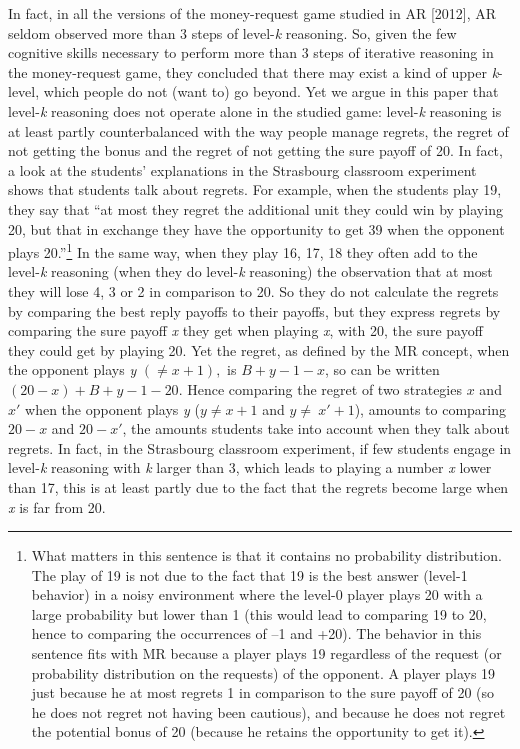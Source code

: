 \begin{Article}
\begin{refsection}[Umbhauer]
In fact, in all the versions of the money-request game studied in AR
{[}2012{]}, AR seldom observed more than 3 steps of level-\emph{k}
reasoning. So, given the few cognitive skills necessary to perform more
than 3 steps of iterative reasoning in the money-request game, they
concluded that there may exist a kind of upper \emph{k}-level, which
people do not (want to) go beyond. Yet we argue in this paper that
level-\emph{k} reasoning does not operate alone in the studied game:
level-\emph{k} reasoning is at least partly counterbalanced with the way
people manage regrets, the regret of not getting the bonus and the
regret of not getting the sure payoff of 20. In fact, a look at the
students' explanations in the Strasbourg classroom experiment shows that
students talk about regrets. For example, when the students play 19,
they say that ``at most they regret the additional unit they could win
by playing 20, but that in exchange they have the opportunity to get 39
when the opponent plays 20.''\footnote{What matters in this sentence is
  that it contains no probability distribution. The play of 19 is not
  due to the fact that 19 is the best answer (level-1 behavior) in a
  noisy environment where the level-0 player plays 20 with a large
  probability but lower than 1 (this would lead to comparing 19 to 20,
  hence to comparing the occurrences of --1 and +20). The behavior in
  this sentence fits with MR because a player plays 19 regardless of the
  request (or probability distribution on the requests) of the opponent.
  A player plays 19 just because he at most regrets 1 in comparison to
  the sure payoff of 20 (so he does not regret not having been
  cautious), and because he does not regret the potential bonus of 20
  (because he retains the opportunity to get it).} In the same way, when
they play 16, 17, 18 they often add to the level-\emph{k} reasoning
(when they do level-\emph{k} reasoning) the observation that at most
they will lose 4, 3 or 2 in comparison to 20. So they do not calculate
the regrets by comparing the best reply payoffs to their payoffs, but
they express regrets by comparing the sure payoff \emph{x} they get when
playing \emph{x}, with 20, the sure payoff they could get by playing 20.
Yet the regret, as defined by the MR concept, when the opponent plays
\emph{y} \(( \neq x + 1),\) is \(B + y - 1 - x\), so can be written
\((20 - x) + B + y - 1 - 20\). Hence comparing the regret of two
strategies $x$ and $x′$ when the opponent plays \emph{y}
(\(y \neq x + 1\) and \(y \neq \ x' + 1\)), amounts to comparing
\(20 - x\) and \(20 - x'\), the amounts students take into
account when they talk about regrets. In fact, in the Strasbourg
classroom experiment, if few students engage in level-\emph{k} reasoning
with \emph{k} larger than 3, which leads to playing a number \emph{x}
lower than 17, this is at least partly due to the fact that the regrets
become large when \emph{x} is far from 20.


\end{refsection}
\end{Article}
